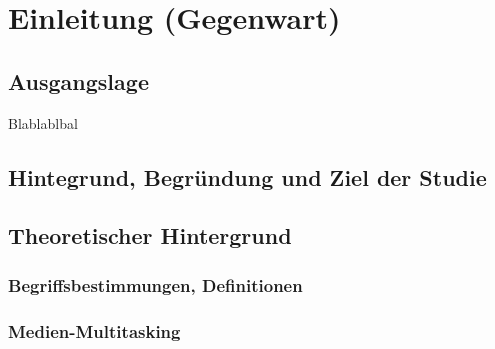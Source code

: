 %
%
\glsresetall
\let\raggedsection\centering 
\chapter{Einleitung (Gegenwart)}\label{chap.einleitung}
\let\raggedsection\raggedright 

\section{Ausgangslage}\label{section.ausgangslage}
Blablablbal

\section{Hintegrund, Begründung und Ziel der Studie}\label{section.hintergrund}

\section{Theoretischer Hintergrund}\label{section.theoHintegrund}
\subsection{Begriffsbestimmungen, Definitionen}\label{subsection.begriffsbestimmung}
\subsection{Medien-Multitasking}\label{subsection.medienMultitasking}
